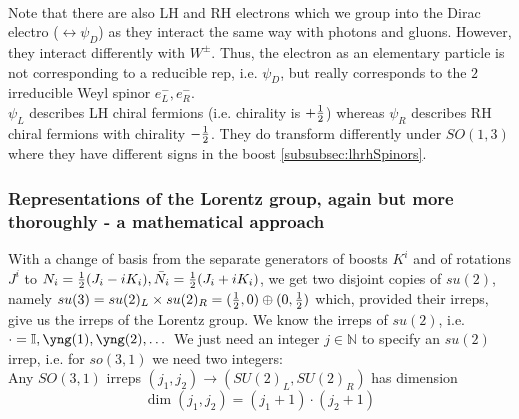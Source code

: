 \begin{enumerate}
\\
Note that there are also LH and RH electrons which we group into the Dirac electro ($\leftrightarrow\psi_D$) as they interact the same way with photons and gluons. However, they interact differently with $W^\pm$. Thus, the electron as an elementary particle is not corresponding to a reducible rep, i.e. $\psi_D$, but really corresponds to the $2$ irreducible Weyl spinor $e^-_L,e^-_R$.\\
$\psi_L$ describes LH chiral fermions (i.e. chirality is $+\frac{1}{2}$) whereas $\psi_R$ describes RH chiral fermions with chirality $-\frac{1}{2}$. They do transform differently under $SO(1,3)$ where they have different signs in the boost \ref{subsubsec:lhrhSpinors}.
\end{enumerate} 


\subsubsection{Representations of the Lorentz group, again but more thoroughly - a mathematical approach}
With a change of basis from the separate generators of boosts $K^i$ and of rotations $J^i$ to $N_i = \frac{1}{2} (J_i -i K_i),\bar{ N}_i=\frac{1}{2} (J_i +i K_i)$, we get two disjoint copies of $su(2)$, namely $su(3)=su(2)_L \times su(2)_R = (\frac{1}{2},0) \oplus (0,\frac{1}{2})$ which, provided their irreps, give us the irreps of the Lorentz group. We know the irreps of $su(2)$, i.e. $\cdot=\mI,\yng(1),\yng(2),\dots$ We just need an integer $j\in \mathbb{N}$ to specify an $su(2)$ irrep, i.e. for $so(3,1)$ we need two integers:\\
Any $SO(3,1)$ irreps $(j_1,j_2)\rightarrow(SU(2)_L,SU(2)_R)$ has dimension
\begin{equation*}
\dim(j_1,j_2) = (j_1+1)\cdot (j_2+1)
\end{equation*}
